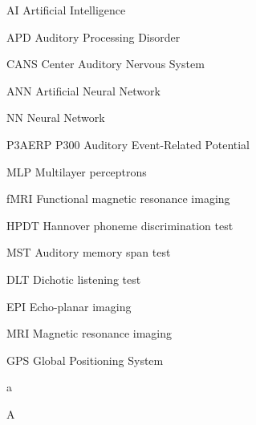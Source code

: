 \documentclass[letterpaper%
, twoside%
, 12pt%
,these%
, english%
,creativecommons,hyperref%
]{thETS}
\begin{document}
\tableofcontents


\listoftables


\listoffigures


\begin{listofabbr}[3cm]
\item[AI] Artificial Intelligence
\item[APD] Auditory Processing Disorder
\item[CANS] Center Auditory Nervous System
\item[ANN] Artificial Neural Network
\item[NN] Neural Network
\item[P3AERP] P300 Auditory Event-Related Potential
\item[MLP] Multilayer perceptrons
\item[fMRI] Functional magnetic resonance imaging
\item[HPDT] Hannover phoneme discrimination test

\item[MST] Auditory memory span test
\item[DLT] Dichotic listening test
\item[EPI] Echo-planar imaging
\item[MRI] Magnetic resonance imaging
\item[GPS] Global Positioning System

\end{listofabbr}


\begin{listofsymbols}[3cm]
\item [a] 
\item [A] 
\end{listofsymbols}


\cleardoublepage


\reversemarginpar

\end{document}
